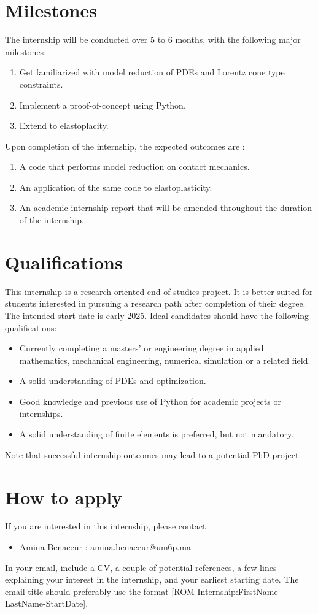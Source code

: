 \documentclass[12pt]{article}
\begin{document}
	\section{Milestones}
	The internship will be conducted over 5 to 6 months, with the following major milestones:
	\begin{enumerate}
		\item Get familiarized with model reduction of PDEs and Lorentz cone type constraints.
		\item Implement a proof-of-concept using Python.
		\item Extend to elastoplacity.
	\end{enumerate}
	Upon completion of the internship, the expected outcomes are :
	\begin{enumerate}
		\item A code that performs model reduction on contact mechanics.
		\item An application of the same code to elastoplasticity.
		\item An academic internship report that will be amended throughout the duration of the internship.
	\end{enumerate}
	
	
	\section{Qualifications}
	This internship is a research oriented end of studies project. It is better suited for students interested in pursuing a research path after completion of their degree. The intended start date is early 2025. Ideal candidates should have the following qualifications:
	\begin{itemize}
		\item Currently completing a masters' or engineering degree in applied mathematics, mechanical engineering, numerical simulation or a related field.
		\item A solid understanding of PDEs and optimization.
		\item Good knowledge and previous use of Python for academic projects or internships.
		\item A solid understanding of finite elements is preferred, but not mandatory.
	\end{itemize}
	Note that successful internship outcomes may lead to a potential PhD project.
	\section{How to apply}
	If you are interested in this internship, please contact 
	\begin{itemize}
		\item Amina Benaceur : amina.benaceur@um6p.ma
	\end{itemize}
	In your email, include a CV, a couple of potential references, a few lines explaining your interest in the internship, and your earliest starting date.
	The email title should preferably use the format [ROM-Internship:FirstName-LastName-StartDate].
	
	
\end{document}
